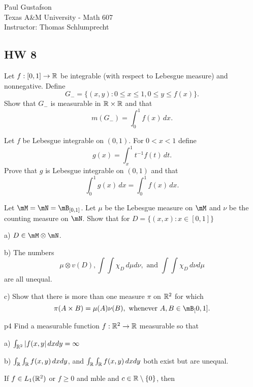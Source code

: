 \documentclass{article}
\begin{document}
\noindent Paul Gustafson\\
\noindent Texas A\&M University - Math 607\\ 
\noindent Instructor: Thomas Schlumprecht

\subsection*{HW 8}

















 Let $f:[0,1] \to \mathbb{R}$ be integrable (with respect to Lebesgue measure) and nonnegative. Define 
$$G_{-} =  \{(x,y) : 0 \le x \le 1, 0 \le y \le f(x) \}.$$
Show that $G_-$ is measurable in $\mathbb{R} \times \mathbb{R}$ and that 
$$m(G_-) = \int_0^1 f(x) \, dx.$$

 Let $f$ be Lebesgue integrable on $(0,1)$. For $0< x < 1$ define
$$g(x) = \int_x^1 t^{-1} f(t) \, dt.$$
Prove that $g$ is Lebesgue integrable on $(0,1)$ and that 
$$\int_0^1 g(x) \, dx = \int_0^1 f(x) \, dx.$$

 Let $\mM = \mN = \mB_{[0,1]}$. Let $\mu$ be the Lebesgue measure on $\mM$ and $\nu$ be the counting measure on $\mN$. Show that for $D = \{(x,x) : x \in [0,1]\}$

a) $D \in \mM \otimes \mN$.

b) The numbers 
$$\mu \otimes v (D), \int \int \chi_D \, d\mu d\nu, \text{ and } \int \int \chi_D \, d\nu d\mu$$
are all unequal.

c) Show that there is more than one measure $\pi$ on $\mathbb{R}^2$ for which
$$ \pi(A \times B) = \mu(A) \nu(B), \text{ whenever } A, B \in \mB_[0,1].$$

p{4} Find a measurable function $f: \mathbb{R}^2 \to \mathbb{R}$ measurable so that

a) $\int_{\mathbb{R}^2} |f(x,y| \, dx dy = \infty$

b) $\int_{\mathbb{R}} \int _{\mathbb{R}} f(x,y) \, dx dy$, and $\int_{\mathbb{R}} \int_{\mathbb{R}} f(x,y) \, dx dy$ both exist but are unequal.


 If $f \in L_1(\R^2)$ or $f \ge 0$ and mble and $c \in \R \setminus \{0\}$, then
$$
\end{document}
